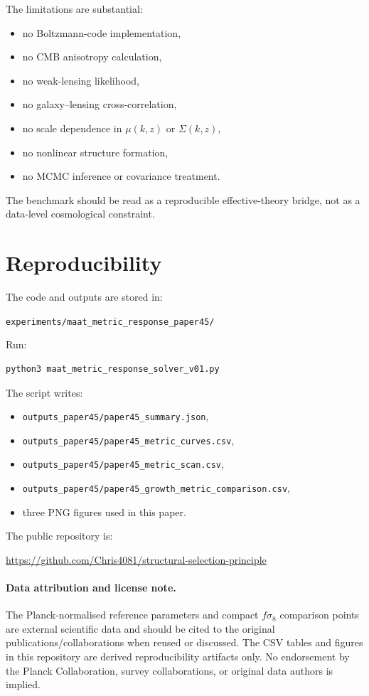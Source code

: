 \documentclass[11pt,a4paper]{article}
\newcommand{\fsig}{f\sigma_8}
\begin{document}
The limitations are substantial:
\begin{itemize}[leftmargin=1.5em]
\item no Boltzmann-code implementation,
\item no CMB anisotropy calculation,
\item no weak-lensing likelihood,
\item no galaxy--lensing cross-correlation,
\item no scale dependence in $\mu(k,z)$ or $\Sigma(k,z)$,
\item no nonlinear structure formation,
\item no MCMC inference or covariance treatment.
\end{itemize}
The benchmark should be read as a reproducible effective-theory bridge, not as
a data-level cosmological constraint.

\section{Reproducibility}

The code and outputs are stored in:
\begin{center}
\texttt{experiments/maat\_metric\_response\_paper45/}
\end{center}

Run:
\begin{verbatim}
python3 maat_metric_response_solver_v01.py
\end{verbatim}

The script writes:
\begin{itemize}[leftmargin=1.5em]
\item \texttt{outputs\_paper45/paper45\_summary.json},
\item \texttt{outputs\_paper45/paper45\_metric\_curves.csv},
\item \texttt{outputs\_paper45/paper45\_metric\_scan.csv},
\item \texttt{outputs\_paper45/paper45\_growth\_metric\_comparison.csv},
\item three PNG figures used in this paper.
\end{itemize}

The public repository is:
\begin{center}
\url{https://github.com/Chris4081/structural-selection-principle}
\end{center}

\paragraph{Data attribution and license note.}
The Planck-normalised reference parameters and compact $\fsig$ comparison
points are external scientific data and should be cited to the original
publications/collaborations when reused or discussed.
The CSV tables and figures in this repository are derived reproducibility
artifacts only.
No endorsement by the Planck Collaboration, survey collaborations, or original
data authors is implied.
\end{document}
